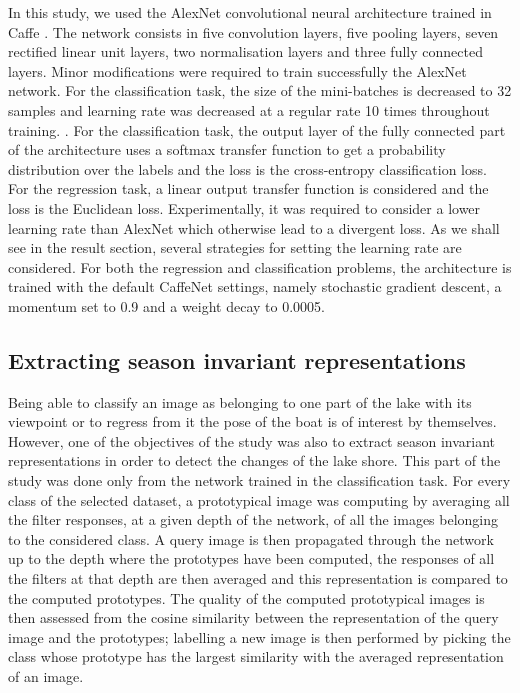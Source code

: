 In this study, we used the AlexNet convolutional neural architecture \cite{NIPS2012_4824} trained in Caffe \cite{jia2014caffe}. The network consists in five convolution layers, five pooling layers, seven rectified linear unit layers, two normalisation layers and three fully connected layers. Minor modifications were required to train successfully the AlexNet network. For the classification task, the size of the mini-batches is decreased to 32 samples and learning rate was decreased at a regular rate 10 times throughout training. . For the classification task, the output layer of the fully connected part of the architecture uses a softmax transfer function to get a probability distribution over the labels and the loss is the cross-entropy classification loss. For the regression task, a linear output transfer function is considered and the loss is the Euclidean loss. Experimentally, it was required to consider a lower learning rate than AlexNet which otherwise lead to a divergent loss. As we shall see in the result section, several strategies for setting the learning rate are considered. For both the regression and classification problems, the architecture is trained with the default CaffeNet settings, namely stochastic gradient descent, a momentum set to 0.9 and a weight decay to 0.0005.


\subsection{Extracting season invariant representations}

Being able to classify an image as belonging to one part of the lake with its viewpoint or to regress from it the pose of the boat is of interest by themselves. However, one of the objectives of the study was also to extract season invariant representations in order to detect the changes of the lake shore. This part of the study was done only from the network trained in the classification task. For every class of the selected dataset, a prototypical image was computing by averaging all the filter responses, at a given depth of the network, of all the images belonging to the considered class. A query image is then propagated through the network up to the depth where the prototypes have been computed, the responses of all the filters at that depth are then averaged and this representation is compared to the computed prototypes. The quality of the computed prototypical images is then assessed from the cosine similarity between the representation of the query image and the prototypes; labelling a new image is then performed by picking the class whose prototype has the largest similarity with the averaged representation of an image.
